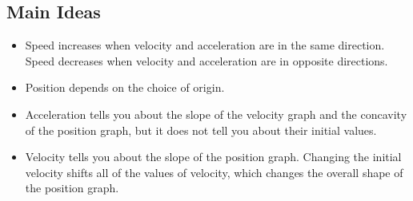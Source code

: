 \documentclass[]{article}
\begin{document}
\begin{PresentSpace}
\section*{Main Ideas}
\begin{itemize}
	\item Speed increases when velocity and acceleration are in the same direction. Speed decreases when velocity and acceleration are in opposite directions.
	\item Position depends on the choice of origin.
	\item Acceleration tells you about the slope of the velocity graph and the concavity of the position graph, but it does not tell you about their initial values.
	\item Velocity tells you about the slope of the position graph. Changing the initial velocity shifts all of the values of velocity, which changes the overall shape of the position graph.
\end{itemize}
\end{PresentSpace}
\end{document}

